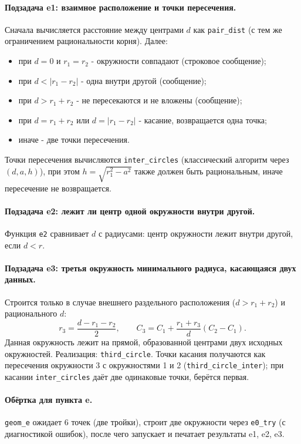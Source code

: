 \documentclass[a4paper, 11pt]{article}
\begin{document}
\paragraph{Подзадача e1: взаимное расположение и точки пересечения.}
Сначала вычисляется расстояние между центрами $d$ как \texttt{pair\_dist} (с тем же ограничением рациональности корня).
Далее:
\begin{itemize}
  \item при $d=0$ и $r_1=r_2$ - окружности совпадают (строковое сообщение);
  \item при $d<|r_1-r_2|$ - одна внутри другой (сообщение);
  \item при $d>r_1+r_2$ - не пересекаются и не вложены (сообщение);
  \item при $d=r_1+r_2$ или $d=|r_1-r_2|$ - касание, возвращается одна точка;
  \item иначе - две точки пересечения.
\end{itemize}
Точки пересечения вычисляются \texttt{inter\_circles} (классический алгоритм через $(d,a,h)$), при этом $h=\sqrt{r_1^2-a^2}$
также должен быть рациональным, иначе пересечение не возвращается.

\paragraph{Подзадача e2: лежит ли центр одной окружности внутри другой.}
Функция \texttt{e2} сравнивает $d$ с радиусами: центр окружности лежит внутри другой, если $d<r$.

\paragraph{Подзадача e3: третья окружность минимального радиуса, касающаяся двух данных.}
Строится только в случае внешнего раздельного расположения ($d>r_1+r_2$) и рационального $d$:
\[
r_3=\frac{d-r_1-r_2}{2},\qquad
C_3 = C_1 + \frac{r_1+r_3}{d}(C_2-C_1).
\]
Данная окружность лежит на прямой, образованной центрами двух исходных окружностей.
\newline
Реализация: \texttt{third\_circle}. Точки касания получаются как пересечения окружности 3 с окружностями 1 и 2
(\texttt{third\_circle\_inter}); при касании \texttt{inter\_circles} даёт две одинаковые точки, берётся первая.

\paragraph{Обёртка для пункта e.}
\texttt{geom\_e} ожидает 6 точек (две тройки), строит две окружности через \texttt{e0\_try} (с диагностикой ошибок),
после чего запускает и печатает результаты e1, e2, e3.
\newpage
\end{document}
